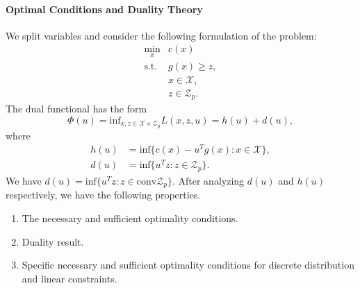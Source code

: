 \documentclass[a4pper,11pt]{article}
\begin{document}
\paragraph{Optimal Conditions and Duality Theory}
We split variables and consider the following formulation of the problem:
\begin{equation}
    \label{4.1}
    \begin{array}{ll}
        \min_x      & c(x)               \\
        \text{s.t.} & g(x)\geq z,        \\
                    & x\in \mathcal X,   \\
                    & z\in \mathcal Z_p.
    \end{array}
\end{equation}
The dual functional has the form
$$
    \Phi(u)=\text{inf}_{x,z\in \mathcal X\times \mathcal Z_p} L(x,z,u)=h(u)+d(u),
$$
where
$$
    \begin{aligned}
        h(u) & =\text{inf}\{c(x)-u^Tg(x):x\in\mathcal X\}, \\
        d(u) & =\text{inf}\{u^Tz:z\in \mathcal Z_p\}.
    \end{aligned}
$$
We have $d(u)=\text{inf}\{u^Tz:z\in \text{conv} \mathcal Z_p\}$.
After analyzing $d(u)$ and $h(u)$ respectively, we have the following properties.
\begin{enumerate}
    \item The necessary and sufficient optimality conditions.\\
    \item Duality result.\\
    \item Specific necessary and sufficient optimality conditions for discrete distribution and linear constraints.\\
\end{enumerate}
\end{document}
